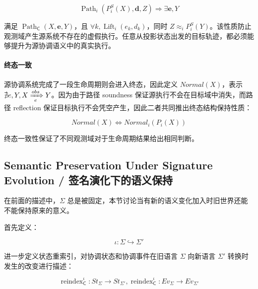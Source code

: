   \begin{equation}
    \boxed{
      \operatorname{Path}_{i}
      (P_i^S(X),\mathbf d,Z)
      \Rightarrow
      \exists
      \mathbf e,Y
    }
    \label{eq:path-reflection}
  \end{equation}

  满足 $\operatorname{Path}_{\mathsf C}(X,\mathbf e,Y)$，且 $\forall k,\operatorname{Lift}_i(e_k,d_k)$，同时 $Z\approx_iP_i^S(Y)$。该性质防止观测域产生源系统不存在的虚假执行。任意从投影状态出发的目标轨迹，都必须能够提升为源协调语义中的真实执行。

  \paragraph{终态一致} 源协调系统完成了一段生命周期则会进入终态，因此定义 $Normal(X)$，表示 $\nexists e,Y,X\xRightarrow[e]{obs}Y$。因为由于路径 soundness 保证源执行不会在目标域中消失，而路径 reflection 保证目标执行不会凭空产生，因此二者共同推出终态结构保持性质：

  \begin{equation}
    \boxed{
      Normal(X)
      \iff
      Normal_i(P_i(X))
    }
    \label{eq:projection-terminal-consistency}
  \end{equation}

  终态一致性保证了不同观测域对于生命周期结果给出相同判断。

  \subsection{Semantic Preservation Under Signature Evolution /
  签名演化下的语义保持}

  在前面的描述中，$\Sigma$ 总是被固定，本节讨论当有新的语义变化加入时旧世界还能不能保持原来的意义。

  首先定义：

  \begin{equation}
    \boxed{
      \iota:
      \Sigma
      \hookrightarrow
      \Sigma'
    }
    \label{eq:signature-embedding}
  \end{equation}

  进一步定义状态重索引，对协调状态和协调事件在旧语言 $\Sigma$ 向新语言 $\Sigma'$ 转换时发生的改变进行描述：

  \begin{equation}
    \boxed{
      \operatorname{reindex}_{\mathsf C}^{\iota}
      : St_\Sigma
      \rightarrow
      St_{\Sigma'},\operatorname{reindex}_{\mathsf C}^{\iota}:
      Ev_\Sigma
      \rightarrow
      Ev_{\Sigma'}
    }
    \label{eq:source-state-event-reindexing}
  \end{equation}


